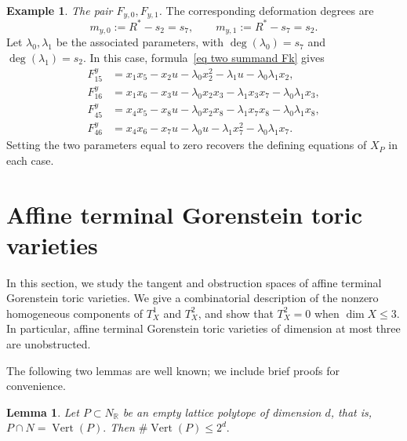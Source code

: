 \documentclass[11pt]{amsart}
\numberwithin{equation}{section}
\theoremstyle{plain}
\newtheorem{lemma}[theorem]{Lemma}
\theoremstyle{definition}
\newtheorem{example}[theorem]{Example}
\newcommand{\0}{$0$-mutable}
\renewcommand{\1}{$1$-rigid}
\renewcommand{\0}{$0$-mutable}
\begin{document}
\begin{example}
\smallskip
\noindent\emph{The pair \(F_{y,0},F_{y,1}\).}
The corresponding deformation degrees are
\[
m_{y,0}:=R^*-s_2=s_7,
\qquad
m_{y,1}:=R^*-s_7=s_2.
\]
Let \(\lambda_0,\lambda_1\) be the associated parameters, with
\(\deg(\lambda_0)=s_7\) and \(\deg(\lambda_1)=s_2\).
In this case, formula~\eqref{eq two summand Fk} gives
\[
\begin{aligned}
F^{y}_{15}
&=x_1x_5-x_2u
-\lambda_0x_2^2-\lambda_1u-\lambda_0\lambda_1x_2,
\\
F^{y}_{16}
&=x_1x_6-x_3u
-\lambda_0x_2x_3-\lambda_1x_3x_7-\lambda_0\lambda_1x_3,
\\
F^{y}_{45}
&=x_4x_5-x_8u
-\lambda_0x_2x_8-\lambda_1x_7x_8-\lambda_0\lambda_1x_8,
\\
F^{y}_{46}
&=x_4x_6-x_7u
-\lambda_0u-\lambda_1x_7^2-\lambda_0\lambda_1x_7.
\end{aligned}
\]
Setting the two parameters equal to zero recovers the defining
equations of \(X_P\) in each case.
\end{example}






























\section{Affine terminal Gorenstein toric varieties}\label{sec 4 affine gor ter}




In this section, we study the tangent and obstruction spaces of affine terminal Gorenstein toric varieties. We give a combinatorial description of the nonzero homogeneous components of $T_X^1$ and $T_X^2$, and show that $T_X^2=0$ when \(\dim X\leq3\). In particular, affine terminal Gorenstein toric varieties of dimension at most three are unobstructed.


The following two lemmas are well known; we include brief proofs for
convenience.


\begin{lemma}\label{lem empty polytope vertices}
Let \(P\subset N_{\mathbb R}\) be an empty lattice polytope of
dimension \(d\), that is,
$
P\cap N=\operatorname{Vert}(P).
$
Then
$
\#\operatorname{Vert}(P)\leq 2^d.
$
\end{lemma}
\end{document}
